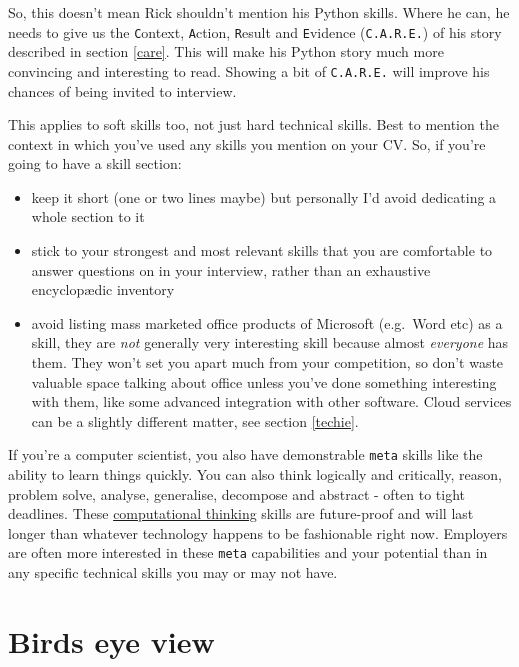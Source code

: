 \documentclass[
]{book}
\providecommand{\tightlist}{%
  \setlength{\itemsep}{0pt}\setlength{\parskip}{0pt}}
\begin{document}
So, this doesn't mean Rick shouldn't mention his Python skills. Where he can, he needs to give us the \texttt{C}ontext, \texttt{A}ction, \texttt{R}esult and \texttt{E}vidence (\texttt{C.A.R.E.}) of his story described in section \ref{care}. This will make his Python story much more convincing and interesting to read. Showing a bit of \texttt{C.A.R.E.} will improve his chances of being invited to interview.

This applies to soft skills too, not just hard technical skills. Best to mention the context in which you've used any skills you mention on your CV. So, if you're going to have a skill section:

\begin{itemize}
\tightlist
\item
  keep it short (one or two lines maybe) but personally I'd avoid dedicating a whole section to it
\item
  stick to your strongest and most relevant skills that you are comfortable to answer questions on in your interview, rather than an exhaustive encyclopædic inventory
\item
  avoid listing mass marketed office products of Microsoft (e.g.~Word etc) as a skill, they are \emph{not} generally very interesting skill because almost \emph{everyone} has them. They won't set you apart much from your competition, so don't waste valuable space talking about office unless you've done something interesting with them, like some advanced integration with other software. Cloud services can be a slightly different matter, see section \ref{techie}.
\end{itemize}

If you're a computer scientist, you also have demonstrable \texttt{meta} skills like the ability to learn things quickly. You can also think logically and critically, reason, problem solve, analyse, generalise, decompose and abstract - often to tight deadlines. These \href{https://en.wikipedia.org/wiki/Computational_thinking}{computational thinking} skills are future-proof and will last longer than whatever technology happens to be fashionable right now. Employers are often more interested in these \texttt{meta} capabilities and your potential than in any specific technical skills you may or may not have.

\hypertarget{birds-eye-view}{%
\section{Birds eye view}\label{birds-eye-view}}
\end{document}
